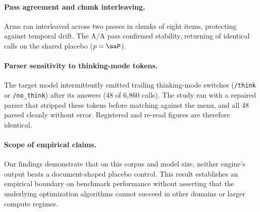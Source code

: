 \paragraph{Pass agreement and chunk interleaving.} Arms ran interleaved across
two passes in chunks of eight items, protecting against temporal drift. The A/A
pass confirmed stability, returning \NUM{\aaPairs} of \NUM{\aaPairs} identical
calls on the shared placebo ($p = \NUM{\aaP}$).

\paragraph{Parser sensitivity to thinking-mode tokens.} The target model
intermittently emitted trailing thinking-mode switches (\texttt{/think} or
\texttt{/no\_think}) after its answers (48 of 6,860 calls). The study ran with
a repaired parser that stripped these tokens before matching against the menu,
and all 48 parsed cleanly without error. Registered and re-read figures are
therefore identical.

\paragraph{Scope of empirical claims.} Our findings demonstrate that on this
corpus and model size, neither engine's output beats a document-shaped
placebo control. This result establishes an empirical boundary on benchmark
performance without asserting that the underlying optimization algorithms
cannot succeed in other domains or larger compute regimes.
